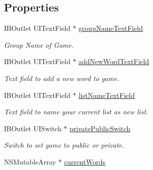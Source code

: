 \subsection*{Properties}
\begin{DoxyCompactItemize}
\item 
\hypertarget{interface_home_screen_ad3ce08e7b1e5daffeb98b941b8742a19}{I\+B\+Outlet U\+I\+Text\+Field $\ast$ \hyperlink{interface_home_screen_ad3ce08e7b1e5daffeb98b941b8742a19}{group\+Name\+Text\+Field}}\label{interface_home_screen_ad3ce08e7b1e5daffeb98b941b8742a19}

\begin{DoxyCompactList}\small\item\em Group Name of Game. \end{DoxyCompactList}\item 
\hypertarget{interface_home_screen_ad05dbbf403f70cd97594677f3791aba6}{I\+B\+Outlet U\+I\+Text\+Field $\ast$ \hyperlink{interface_home_screen_ad05dbbf403f70cd97594677f3791aba6}{add\+New\+Word\+Text\+Field}}\label{interface_home_screen_ad05dbbf403f70cd97594677f3791aba6}

\begin{DoxyCompactList}\small\item\em Text field to add a new word to game. \end{DoxyCompactList}\item 
\hypertarget{interface_home_screen_add06a1e4059aaf65a036e42d0b7c88ec}{I\+B\+Outlet U\+I\+Text\+Field $\ast$ \hyperlink{interface_home_screen_add06a1e4059aaf65a036e42d0b7c88ec}{list\+Name\+Text\+Field}}\label{interface_home_screen_add06a1e4059aaf65a036e42d0b7c88ec}

\begin{DoxyCompactList}\small\item\em Text field to name your current list as new list. \end{DoxyCompactList}\item 
\hypertarget{interface_home_screen_a19c020612fc5c01e9ddbdab3ff548782}{I\+B\+Outlet U\+I\+Switch $\ast$ \hyperlink{interface_home_screen_a19c020612fc5c01e9ddbdab3ff548782}{private\+Public\+Switch}}\label{interface_home_screen_a19c020612fc5c01e9ddbdab3ff548782}

\begin{DoxyCompactList}\small\item\em Switch to set game to public or private. \end{DoxyCompactList}\item 
\hypertarget{interface_home_screen_a10b26f9b81975572a6bcc3b78f5ea269}{N\+S\+Mutable\+Array $\ast$ \hyperlink{interface_home_screen_a10b26f9b81975572a6bcc3b78f5ea269}{current\+Words}}\label{interface_home_screen_a10b26f9b81975572a6bcc3b78f5ea269}


\end{DoxyCompactItemize}
